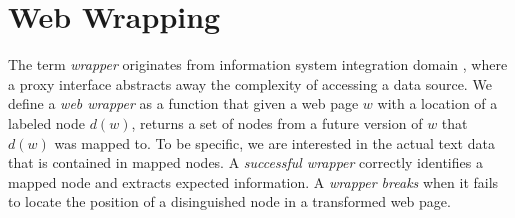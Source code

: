 \section{Web Wrapping}

The term \emph{wrapper} originates from information system integration domain \cite{Chang:2006:SWI:1159162.1159300}, where a proxy interface abstracts away the complexity of accessing a data source. We define a \emph{web wrapper} as a function that given a web page $w$ with a location of a labeled node $d(w)$, returns a set of nodes from a future version of $w$ that $d(w)$ was mapped to. To be specific, we are interested in the actual text data that is contained in mapped nodes. A \emph{successful wrapper} correctly identifies a mapped node and extracts expected information. A \emph{wrapper breaks} when it fails to locate the position of a disinguished node in a transformed web page.


